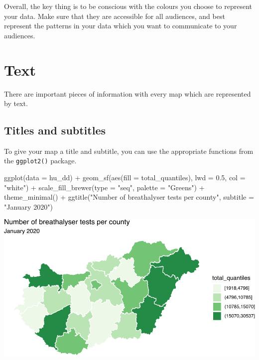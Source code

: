 \documentclass[
]{book}
\newenvironment{Shaded}{\begin{snugshade}}{\end{snugshade}}
\newcommand{\AttributeTok}[1]{\textcolor[rgb]{0.77,0.63,0.00}{#1}}
\newcommand{\FloatTok}[1]{\textcolor[rgb]{0.00,0.00,0.81}{#1}}
\newcommand{\FunctionTok}[1]{\textcolor[rgb]{0.00,0.00,0.00}{#1}}
\newcommand{\NormalTok}[1]{#1}
\newcommand{\SpecialCharTok}[1]{\textcolor[rgb]{0.00,0.00,0.00}{#1}}
\newcommand{\StringTok}[1]{\textcolor[rgb]{0.31,0.60,0.02}{#1}}
\begin{document}
Overall, the key thing is to be conscious with the colours you choose to represent your data. Make sure that they are accessible for all audiences, and best represent the patterns in your data which you want to communicate to your audiences.

\hypertarget{text}{%
\section{Text}\label{text}}

There are important pieces of information with every map which are represented by text.

\hypertarget{titles-and-subtitles}{%
\subsection{Titles and subtitles}\label{titles-and-subtitles}}

To give your map a title and subtitle, you can use the appropriate functions from the \texttt{ggplot2()} package.

\begin{Shaded}
\begin{Highlighting}[]
\FunctionTok{ggplot}\NormalTok{(}\AttributeTok{data =}\NormalTok{ hu\_dd) }\SpecialCharTok{+} 
  \FunctionTok{geom\_sf}\NormalTok{(}\FunctionTok{aes}\NormalTok{(}\AttributeTok{fill =}\NormalTok{ total\_quantiles), }\AttributeTok{lwd =} \FloatTok{0.5}\NormalTok{, }\AttributeTok{col =} \StringTok{"white"}\NormalTok{) }\SpecialCharTok{+} 
  \FunctionTok{scale\_fill\_brewer}\NormalTok{(}\AttributeTok{type =} \StringTok{"seq"}\NormalTok{, }\AttributeTok{palette =} \StringTok{"Greens"}\NormalTok{) }\SpecialCharTok{+} 
  \FunctionTok{theme\_minimal}\NormalTok{() }\SpecialCharTok{+} 
  \FunctionTok{ggtitle}\NormalTok{(}\StringTok{"Number of breathalyser tests per county"}\NormalTok{, }\AttributeTok{subtitle =} \StringTok{"January 2020"}\NormalTok{)}
\end{Highlighting}
\end{Shaded}

\includegraphics{crime_mapping_files/figure-latex/titlesubtitle-1.pdf}
\end{document}
